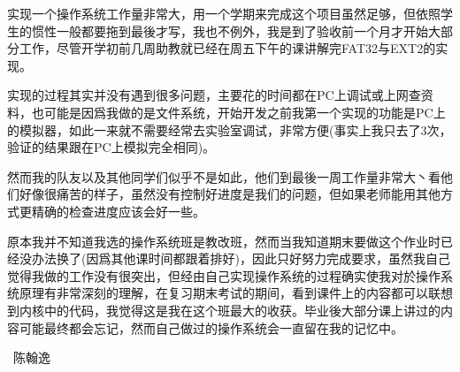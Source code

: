 
实现一个操作系统工作量非常大，用一个学期来完成这个项目虽然足够，但依照学生的惯性一般都要拖到最後才写，我也不例外，我是到了验收前一个月才开始大部分工作，尽管开学初前几周助教就已经在周五下午的课讲解完FAT32与EXT2的实现。

实现的过程其实并没有遇到很多问题，主要花的时间都在PC上调试或上网查资料，也可能是因爲我做的是文件系统，开始开发之前我第一个实现的功能是PC上的模拟器，如此一来就不需要经常去实验室调试，非常方便(事实上我只去了3次，验证的结果跟在PC上模拟完全相同)。

然而我的队友以及其他同学们似乎不是如此，他们到最後一周工作量非常大丶看他们好像很痛苦的样子，虽然没有控制好进度是我们的问题，但如果老师能用其他方式更精确的检查进度应该会好一些。

原本我并不知道我选的操作系统班是教改班，然而当我知道期末要做这个作业时已经没办法换了(因爲其他课时间都跟着排好)，因此只好努力完成要求，虽然我自己觉得我做的工作没有很突出，但经由自己实现操作系统的过程确实使我对於操作系统原理有非常深刻的理解，在复习期末考试的期间，看到课件上的内容都可以联想到内核中的代码，我觉得这是我在这个班最大的收获。毕业後大部分课上讲过的内容可能最终都会忘记，然而自己做过的操作系统会一直留在我的记忆中。

~\hfill 陈翰逸

